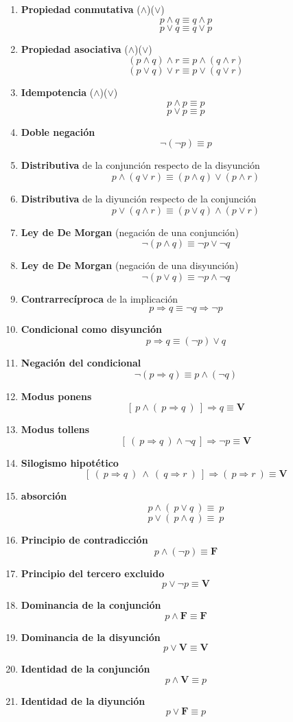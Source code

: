\begin{enumerate}[label=\alph*)]
\item \textbf{Propiedad conmutativa} ($\land$)($\vee$)
	\[p \land q \equiv q \land p\]
	\[p \vee q \equiv q \vee p\]
\item \textbf{Propiedad asociativa} ($\land$)($\vee$)
	\[(p \land q) \land r \equiv p \land (q \land r)\]
	\[(p \vee q) \vee r \equiv p \vee (q \vee r) \]
\item \textbf{Idempotencia} ($\land$)($\vee$)
	\[p \land p \equiv p\]
	\[p \vee p \equiv p\]
\item \textbf{Doble negación}
	\[\lnot (\lnot p) \equiv p\]
\item \textbf{Distributiva} de la conjunción respecto de la disyunción
	\[p \land (q \vee r) \equiv (p \land q) \vee (p \land r)\]
\item \textbf{Distributiva} de la diyunción respecto de la conjunción
	\[p \vee (q \land r) \equiv (p \vee q) \land (p \vee r)\]
\item \textbf{Ley de De Morgan} (negación de una conjunción)
	\[\lnot (p \land q) \equiv \lnot p \vee \lnot q\]
\item \textbf{Ley de De Morgan} (negación de una disyunción)	
	\[\lnot (p \vee q) \equiv \lnot p \land \lnot q\]
\item \textbf{Contrarrecíproca} de la implicación
	\[p \Rightarrow q \equiv \lnot q \Rightarrow \lnot p  \]
\item \textbf{Condicional como disyunción}
	\[p \Rightarrow q \equiv (\lnot p) \vee q  \]
\item \textbf{Negación del condicional}
	\[ \lnot (p \Rightarrow q) \equiv p \land (\lnot q)  \]
\item \textbf{Modus ponens}
	\[ [ \ p \land ( \ p \Rightarrow q \ ) \ ] \Rightarrow q \equiv \textbf{V}\]
\item \textbf{Modus tollens}
	\[ [ \ ( \ p \Rightarrow q \ ) \land \lnot q \ ] \Rightarrow \lnot p \equiv \textbf{V}  \]
\item \textbf{Silogismo hipotético}
	\[[ \ ( \ p \Rightarrow q \ ) \ \land \ ( \ q \Rightarrow r \ ) \ ] \Rightarrow ( \ p \Rightarrow r \ ) \equiv \textbf{V}\] 
\item \textbf{absorción}
	\[ p \land ( \ p \vee q \ ) \equiv \ p \]
	\[ p \vee ( \ p \land q \ ) \equiv \ p \]
\item \textbf{Principio de contradicción}
	\[ p \land (\lnot p) \equiv \textbf{F}\]
\item \textbf{Principio del tercero excluido}	
	\[ p \vee \lnot p \equiv \textbf{V} \]
\item \textbf{Dominancia de la conjunción}
	\[ p \land \textbf{F} \equiv \textbf{F} \]
\item \textbf{Dominancia de la disyunción}
	\[ p \vee \textbf{V} \equiv \textbf{V} \]
\item \textbf{Identidad de la conjunción}	
	\[ p \land \textbf{V} \equiv p \]
\item \textbf{Identidad de la diyunción}	
	\[ p \vee \textbf{F} \equiv p \]
\end{enumerate}

